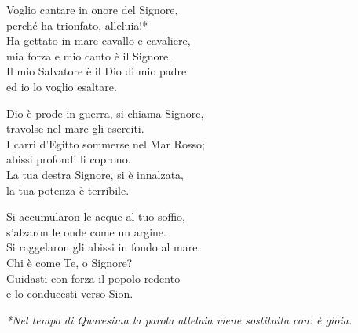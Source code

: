 
 

\spazio

\strofa Voglio cantare in onore del Signore,\\
perché ha trionfato, alleluia!*\\
Ha gettato in mare cavallo e cavaliere,\\
mia forza e mio canto è il Signore.\\
Il mio Salvatore è il Dio di mio padre\\
ed io lo voglio esaltare.

\spazio


\spazio

\strofa Dio è prode in guerra, si chiama Signore,\\
travolse nel mare gli eserciti.\\
I carri d'Egitto sommerse nel Mar Rosso;\\
abissi profondi li coprono.\\
La tua destra Signore, si è innalzata,\\
la tua potenza è terribile.

\spazio


\spazio

\strofa Si accumularon le acque al tuo soffio,\\
s'alzaron le onde come un argine.\\
Si raggelaron gli abissi in fondo al mare.\\
Chi è come Te, o Signore?\\
Guidasti con forza il popolo redento\\
e lo conducesti verso Sion.

\spazio


\spazio

\emph{*Nel tempo di Quaresima la parola alleluia viene sostituita con: è gioia.}
